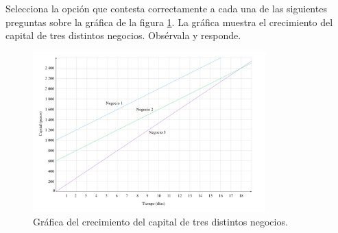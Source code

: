 \question[20] Selecciona la opci\'on que contesta correctamente
a cada una de las siguientes preguntas sobre la gr\'afica de la figura \ref{fig:SINMAT1_U3_AC76_IMG1}.
La gráfica muestra el crecimiento del capital de tres distintos negocios. Obsérvala y responde.
\begin{figure}[H]
    \centering
    \includegraphics[width=0.8\textwidth]{../images/SINMAT1_U3_AC76_IMG1}
    \caption{Gr\'afica del crecimiento del capital de tres distintos negocios.}
    \label{fig:SINMAT1_U3_AC76_IMG1}
\end{figure}
\begin{parts}
    
    
    
    
    
\end{parts}